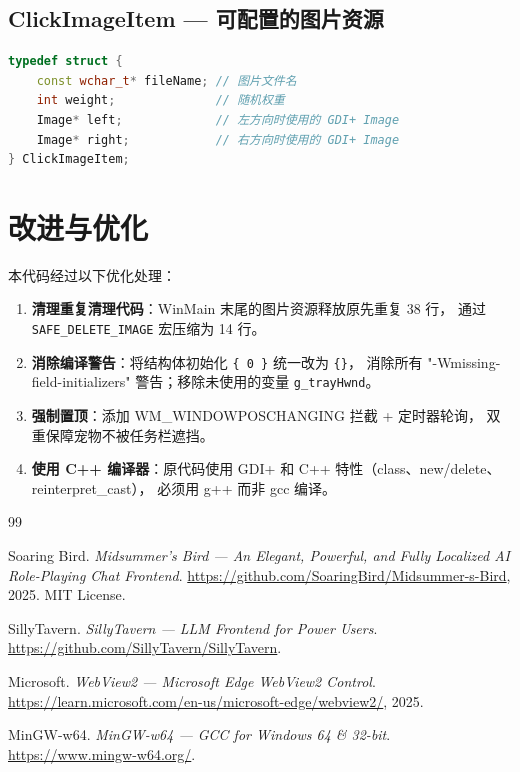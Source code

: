 \documentclass[12pt,a4paper]{ctexart}
\begin{document}
\subsection{ClickImageItem --- 可配置的图片资源}
\begin{lstlisting}[language=C++]
typedef struct {
    const wchar_t* fileName; // 图片文件名
    int weight;              // 随机权重
    Image* left;             // 左方向时使用的 GDI+ Image
    Image* right;            // 右方向时使用的 GDI+ Image
} ClickImageItem;
\end{lstlisting}

\section{改进与优化}

本代码经过以下优化处理：

\begin{enumerate}
    \item \textbf{清理重复清理代码}：WinMain 末尾的图片资源释放原先重复 38 行，
    通过 \texttt{SAFE\_DELETE\_IMAGE} 宏压缩为 14 行。
    \item \textbf{消除编译警告}：将结构体初始化 \texttt{\{ 0 \}} 统一改为 \texttt{\{\}}，
    消除所有 "-Wmissing-field-initializers" 警告；移除未使用的变量 \texttt{g\_trayHwnd}。
    \item \textbf{强制置顶}：添加 WM\_WINDOWPOSCHANGING 拦截 + 定时器轮询，
    双重保障宠物不被任务栏遮挡。
    \item \textbf{使用 C++ 编译器}：原代码使用 GDI+ 和 C++ 特性（class、new/delete、reinterpret\_cast），
    必须用 g++ 而非 gcc 编译。
\end{enumerate}

\begin{thebibliography}{99}

Soaring Bird. \textit{Midsummer's Bird --- An Elegant, Powerful, and Fully Localized AI Role-Playing Chat Frontend}. \url{https://github.com/SoaringBird/Midsummer-s-Bird}, 2025. MIT License.

SillyTavern. \textit{SillyTavern --- LLM Frontend for Power Users}. \url{https://github.com/SillyTavern/SillyTavern}.

Microsoft. \textit{WebView2 --- Microsoft Edge WebView2 Control}. \url{https://learn.microsoft.com/en-us/microsoft-edge/webview2/}, 2025.

MinGW-w64. \textit{MinGW-w64 --- GCC for Windows 64 \& 32-bit}. \url{https://www.mingw-w64.org/}.

\end{thebibliography}
\end{document}
